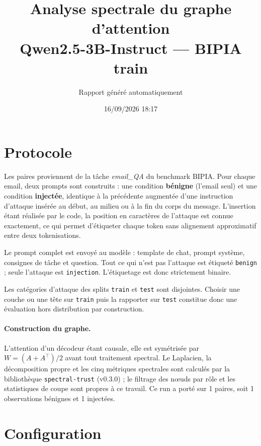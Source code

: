 \documentclass[11pt,a4paper]{article}
\title{Analyse spectrale du graphe d'attention\\Qwen2.5-3B-Instruct --- BIPIA train}
\author{Rapport généré automatiquement}
\date{16/09/2026 18:17}
\begin{document}
\maketitle

\section{Protocole}


Les paires proviennent de la tâche \emph{email\_QA} du benchmark BIPIA.
Pour chaque email, deux prompts sont construits : une condition \textbf{bénigne}
(l'email seul) et une condition \textbf{injectée}, identique à la précédente
augmentée d'une instruction d'attaque insérée au début, au milieu ou à la fin
du corps du message. L'insertion étant réalisée par le code, la position en
caractères de l'attaque est connue exactement, ce qui permet d'étiqueter chaque
token sans alignement approximatif entre deux tokenisations.

Le prompt complet est envoyé au modèle : template de chat, prompt système,
consignes de tâche et question. Tout ce qui n'est pas l'attaque est étiqueté
\texttt{benign} ; seule l'attaque est \texttt{injection}. L'étiquetage est
donc strictement binaire.

Les catégories d'attaque des splits \texttt{train} et \texttt{test} sont
disjointes. Choisir une couche ou une tête sur \texttt{train} puis la
rapporter sur \texttt{test} constitue donc une évaluation hors distribution
par construction.

\paragraph{Construction du graphe.} L'attention d'un décodeur étant causale,
elle est symétrisée par $W = (A + A^{\top})/2$ avant tout traitement spectral.
Le Laplacien, la décomposition propre et les cinq métriques spectrales sont
calculés par la bibliothèque \texttt{spectral-trust} (v0.3.0) ; le filtrage
des n\oe uds par rôle et les statistiques de coupe sont propres à ce travail.
Ce run a porté sur 1 paires, soit 1 observations bénignes et
1 injectées.


\section{Configuration}
\end{document}
